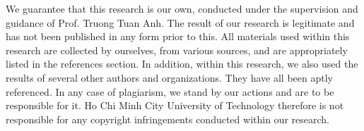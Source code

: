 We guarantee that this research is our own, conducted under the supervision and guidance of Prof. Truong Tuan Anh. The result of our research is legitimate and has not been published in any form prior to this. All materials used within this research are collected by ourselves, from various sources, and are appropriately listed in the references section. In addition, within this research, we also used the results of several other authors and organizations. They have all been aptly referenced. In any case of plagiarism, we stand by our actions and are to be responsible for it. Ho Chi Minh City University of Technology therefore is not responsible for any copyright infringements conducted within our research.